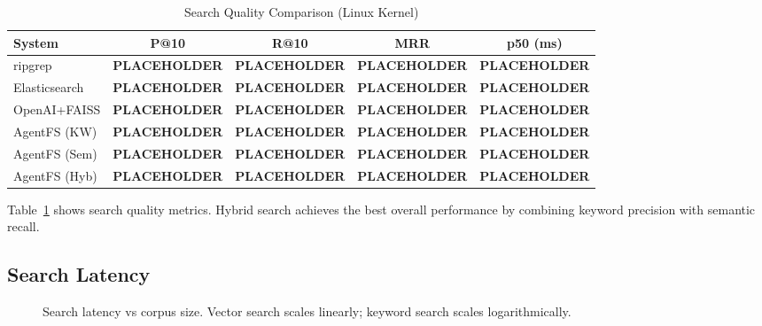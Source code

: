 \documentclass[conference]{IEEEtran}
\begin{document}
\begin{table}[htbp]
\caption{Search Quality Comparison (Linux Kernel)}
\begin{center}
\begin{tabular}{lcccc}
\toprule
\textbf{System} & \textbf{P@10} & \textbf{R@10} & \textbf{MRR} & \textbf{p50 (ms)} \\
\midrule
ripgrep & \textbf{PLACEHOLDER} & \textbf{PLACEHOLDER} & \textbf{PLACEHOLDER} & \textbf{PLACEHOLDER} \\
Elasticsearch & \textbf{PLACEHOLDER} & \textbf{PLACEHOLDER} & \textbf{PLACEHOLDER} & \textbf{PLACEHOLDER} \\
OpenAI+FAISS & \textbf{PLACEHOLDER} & \textbf{PLACEHOLDER} & \textbf{PLACEHOLDER} & \textbf{PLACEHOLDER} \\
AgentFS (KW) & \textbf{PLACEHOLDER} & \textbf{PLACEHOLDER} & \textbf{PLACEHOLDER} & \textbf{PLACEHOLDER} \\
AgentFS (Sem) & \textbf{PLACEHOLDER} & \textbf{PLACEHOLDER} & \textbf{PLACEHOLDER} & \textbf{PLACEHOLDER} \\
AgentFS (Hyb) & \textbf{PLACEHOLDER} & \textbf{PLACEHOLDER} & \textbf{PLACEHOLDER} & \textbf{PLACEHOLDER} \\
\bottomrule
\end{tabular}
\label{tab:quality}
\end{center}
\end{table}

Table~\ref{tab:quality} shows search quality metrics. Hybrid search achieves the best overall performance by combining keyword precision with semantic recall.

\subsection{Search Latency}

\begin{figure}[htbp]
\centering
{}
\caption{Search latency vs corpus size. Vector search scales linearly; keyword search scales logarithmically.}
\label{fig:latency}
\end{figure}
\end{document}
